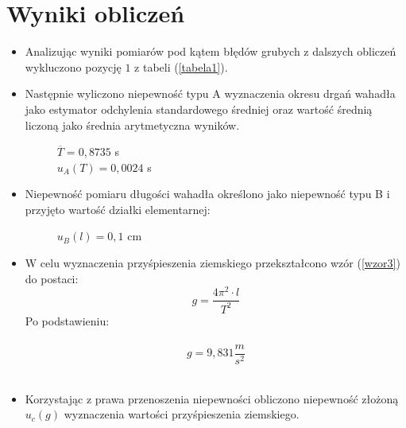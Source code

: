 \documentclass{article}
\begin{document}
\section{Wyniki obliczeń}
 \begin{itemize}
	\item Analizując wyniki pomiarów pod kątem błędów grubych z dalszych obliczeń wykluczono pozycję $1$ z tabeli (\ref{tabela1}).
		
	\item Następnie wyliczono niepewność typu A wyznaczenia okresu drgań wahadła jako estymator odchylenia standardowego średniej oraz wartość
	średnią liczoną jako średnia arytmetyczna wyników.\\
	\begin{figure}[h!]
		\centering
			 $\overline{T} = 0,8735$ s\\
			 \vspace{0.2cm}
			 $u_A(T) = 0,0024$ s
	
	\end{figure}



	\item Niepewność pomiaru długości wahadła określono jako niepewność typu B i przyjęto wartość działki elementarnej: \\
		\begin{figure}[h!]
			\centering
			$u_B(l) = 0,1$ cm
		\end{figure}


		
	\item W celu wyznaczenia przyśpieszenia ziemskiego przekształcono wzór (\ref{wzor3}) do postaci:
		\begin{equation}
			g = \frac{4\pi^2\cdot l}{T^2}
		\end{equation}
		Po podstawieniu:\\\\
		\[ g = 9,831 \frac{m}{s^2} \]\\
		 
		
	\item Korzystając z prawa przenoszenia niepewności obliczono niepewność złożoną $u_c(g)$ wyznaczenia wartości przyśpieszenia ziemskiego.
		

\end{itemize}
\end{document}
